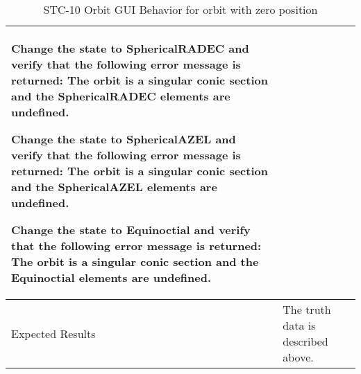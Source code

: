 \begin{table}[htbp!]
\begin{tabular}{|p{1.05 in} |p{4.75 in} |}
\begin{compactenum}
             \item Change the state to SphericalRADEC and verify that the following error message is returned: The orbit is a singular conic section and the SphericalRADEC elements are undefined.
             \item Change the state to SphericalAZEL and verify that the following error message is returned: The orbit is a singular conic section and the SphericalAZEL elements are undefined.
             \item Change the state to Equinoctial and verify that the following error message is returned:
                   The orbit is a singular conic section and the Equinoctial elements are undefined.
         \end{compactenum}
         \\ \hline
         Expected Results & The truth data is described above.\\
      \hline
      \end{tabular}
      \label{Table:STC-10}
      \caption{STC-10 Orbit GUI Behavior for orbit with zero position}
\end{table} 
